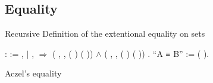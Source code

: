 \subsection{Equality}

Recursive Definition of the extentional equality on sets

\begin{coqdoccode}
  \coqdocnoindent
      :  :=\coqdoceol
  \coqdocindent{1.00em}
   ,  \coqdoceol
  \coqdocindent{1.00em}
  \ensuremath{|}   ,    \ensuremath{\Rightarrow}\coqdoceol
  \coqdocindent{2.00em}
  (\coqdockw{\ensuremath{\forall}} , \coqdoctac{\ensuremath{\exists}} ,  ( ) ( )) \ensuremath{\land} (\coqdockw{\ensuremath{\forall}} , \coqdoctac{\ensuremath{\exists}} ,  ( ) ( ))\coqdoceol
  \coqdocindent{1.00em}
  .\coqdoceol
  \coqdocnoindent
{} ``A ≡ B'' := (  ).\coqdoceol
\coqdocemptyline
\end{coqdoccode}


Aczel's equality


